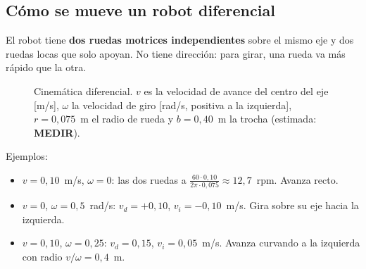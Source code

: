 \subsection{Cómo se mueve un robot diferencial}
El robot tiene \textbf{dos ruedas motrices independientes} sobre el mismo eje y dos ruedas locas que solo apoyan.
No tiene dirección: para girar, una rueda va más rápido que la otra.

\begin{figure}[H]
\centering
{}
\caption{Cinemática diferencial. $v$ es la velocidad de avance del centro del eje [m/s], $\omega$ la velocidad de
giro [rad/s, positiva a la izquierda], $r = 0{,}075$~m el radio de rueda y $b = 0{,}40$~m la trocha (estimada:
\textbf{MEDIR}).}
\label{fig:diferencial}
\end{figure}

Ejemplos:
\begin{itemize}
  \item $v = 0{,}10$~m/s, $\omega = 0$: las dos ruedas a $\frac{60 \cdot 0{,}10}{2\pi \cdot 0{,}075} \approx 12{,}7$~rpm. Avanza recto.
  \item $v = 0$, $\omega = 0{,}5$~rad/s: $v_d = +0{,}10$, $v_i = -0{,}10$~m/s. Gira sobre su eje hacia la izquierda.
  \item $v = 0{,}10$, $\omega = 0{,}25$: $v_d = 0{,}15$, $v_i = 0{,}05$~m/s. Avanza curvando a la izquierda con radio
        $v/\omega = 0{,}4$~m.
\end{itemize}

